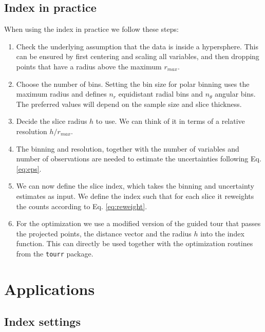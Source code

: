 \documentclass[]{interact}
\theoremstyle{plain}%
\theoremstyle{definition}
\theoremstyle{remark}
\def\tightlist{}
\begin{document}
\hypertarget{index-in-practice}{%
\subsection{Index in practice}\label{index-in-practice}}

When using the index in practice we follow these steps:

\begin{enumerate}
\def\labelenumi{\arabic{enumi}.}
\tightlist
\item
  Check the underlying assumption that the data is inside a hypersphere.
  This can be ensured by first centering and scaling all variables, and
  then dropping points that have a radius above the maximum \(r_{max}\).
\item
  Choose the number of bins. Setting the bin size for polar binning uses
  the maximum radius and defines \(n_r\) equidistant radial bins and
  \(n_{\theta}\) angular bins. The preferred values will depend on the
  sample size and slice thickness.
\item
  Decide the slice radius \(h\) to use. We can think of it in terms of a
  relative resolution \(h/r_{max}\).
\item
  The binning and resolution, together with the number of variables and
  number of observations are needed to estimate the uncertainties
  following Eq.\ref{eq:eps}.
\item
  We can now define the slice index, which takes the binning and
  uncertainty estimates as input. We define the index such that for each
  slice it reweights the counts according to Eq. \ref{eq:reweight}.
\item
  For the optimization we use a modified version of the guided tour that
  passes the projected points, the distance vector and the radius \(h\)
  into the index function. This can directly be used together with the
  optimization routines from the \texttt{tourr} package.
\end{enumerate}

\hypertarget{applications}{%
\section{\texorpdfstring{Applications
\label{sec:applications}}{Applications }}\label{applications}}

\hypertarget{index-settings}{%
\subsection{Index settings}\label{index-settings}}
\end{document}
